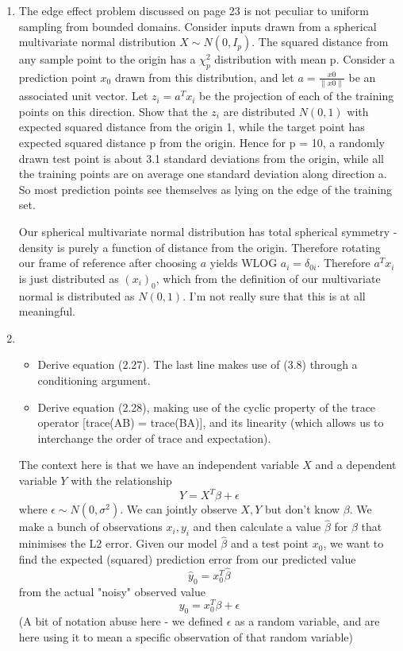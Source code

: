 \documentclass{article}
\newcommand{\chapternumber}{1}
\newenvironment{QandA}{\begin{enumerate}[label=\chapternumber.\arabic*]\bfseries\boldmath}
	{\end{enumerate}}
\newenvironment{answered}{\par\bigskip\normalfont\unboldmath}{}
\begin{document}
\begin{QandA}
	\item The edge effect problem discussed on page 23 is not peculiar to
	uniform sampling from bounded domains. Consider inputs drawn from a
	spherical multivariate normal distribution $X \sim N (0,I_p)$. The squared distance
	from any sample point to the origin has a $\chi^2_p$ distribution with mean p.
	Consider a prediction point $x_0$ drawn from this distribution, and let $a =
	\frac{x0}{\|x0\|}$ be an associated unit vector. Let $z_i = a^Tx_i$ be the projection of
	each of the training points on this direction.
	Show that the $z_i$ are distributed $N (0, 1)$ with expected squared distance
	from the origin 1, while the target point has expected squared distance p
	from the origin.
	Hence for p = 10, a randomly drawn test point is about 3.1 standard
	deviations from the origin, while all the training points are on average
	one standard deviation along direction a. So most prediction points see
	themselves as lying on the edge of the training set.
	
	\begin{answered}
		Our spherical multivariate normal distribution has total spherical symmetry - density is purely a function of distance from the origin. Therefore rotating our frame of reference after choosing $a$ yields WLOG $a_i=\delta_{0i}$. Therefore $a^Tx_i$ is just distributed as $(x_i)_0$, which from the definition of our multivariate normal is distributed as $N(0,1)$.
		I'm not really sure that this is at all meaningful.
	\end{answered}

	\item 
	\begin{itemize}
		\item Derive equation (2.27). The last line makes use of (3.8) through a
		conditioning argument.
		\item Derive equation (2.28), making use of the cyclic property of the trace
		operator [trace(AB) = trace(BA)], and its linearity (which allows us
		to interchange the order of trace and expectation).
	\end{itemize}

	\begin{answered}
		The context here is that we have an independent variable $X$ and a dependent variable $Y$ with the relationship
		\[Y=X^T\beta+\epsilon\]
		where $\epsilon\sim N(0,\sigma^2)$. We can jointly observe $X,Y$ but don't know $\beta$. We make a bunch of observations $x_i,y_i$ and then calculate a value $\hat{\beta}$ for $\beta$ that minimises the L2 error. Given our model $\hat{\beta}$ and a test point $x_0$, we want to find the expected (squared) prediction error from our predicted value
		\[\hat{y}_0=x_0^T\hat{\beta}\]
		from the actual "noisy" observed value
		\[y_0=x_0^T\beta+\epsilon\]
		(A bit of notation abuse here - we defined $\epsilon$ as a random variable, and are here using it to mean a specific observation of that random variable)
		

\end{answered}
\end{QandA}
\end{document}

